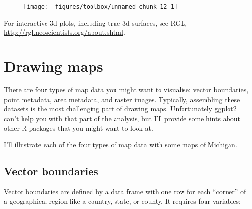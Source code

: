 \begin{Shaded}
\begin{Highlighting}[]
\StringTok{ }\NormalTok{faithfuld[}\NormalTok{(}\NormalTok{, } \NormalTok{), ]}
\StringTok{ }
\StringTok{  }\NormalTok{(}\NormalTok{(}  \NormalTok{/}\NormalTok{) +}\StringTok{ }
\StringTok{  }\NormalTok{()}
\end{Highlighting}
\end{Shaded}

\begin{figure}[H]
  \texttt{[image: \_figures/toolbox/unnamed-chunk-12-1]}
\end{figure}

For interactive 3d plots, including true 3d surfaces, see RGL,
\url{http://rgl.neoscientists.org/about.shtml}.

\hypertarget{sec:maps}{\section{Drawing maps}\label{sec:maps}}

 

There are four types of map data you might want to visualise: vector
boundaries, point metadata, area metadata, and raster images. Typically,
assembling these datasets is the most challenging part of drawing maps.
Unfortunately ggplot2 can't help you with that part of the analysis, but
I'll provide some hints about other R packages that you might want to
look at.

I'll illustrate each of the four types of map data with some maps of
Michigan.

\subsection{Vector boundaries}\label{vector-boundaries}

Vector boundaries are defined by a data frame with one row for each
``corner'' of a geographical region like a country, state, or county. It
requires four variables:

